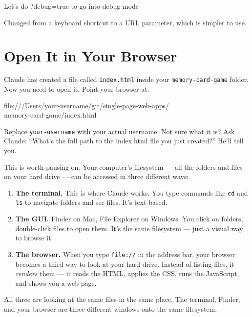 \documentclass[11pt,a4paper]{article}
\begin{document}
\begin{tcolorbox}[promptbox]
Let's do ?debug=true to go into debug mode
\end{tcolorbox}

Changed from a keyboard shortcut to a URL parameter, which is simpler to use.

\section{Open It in Your Browser}

Claude has created a file called \texttt{index.html} inside your \texttt{memory-card-game} folder. Now you need to open it. Point your browser at:

\begin{tcolorbox}[termbox]
file:///Users/your-username/git/single-page-web-apps/\\
\quad memory-card-game/index.html
\end{tcolorbox}

Replace \texttt{your-username} with your actual username. Not sure what it is? Ask Claude: ``What's the full path to the index.html file you just created?'' He'll tell you.

This is worth pausing on. Your computer's filesystem --- all the folders and files on your hard drive --- can be accessed in three different ways:

\begin{enumerate}[leftmargin=1.5em]
  \item \textbf{The terminal.} This is where Claude works. You type commands like \texttt{cd} and \texttt{ls} to navigate folders and see files. It's text-based.
  \item \textbf{The GUI.} Finder on Mac, File Explorer on Windows. You click on folders, double-click files to open them. It's the same filesystem --- just a visual way to browse it.
  \item \textbf{The browser.} When you type \texttt{file://} in the address bar, your browser becomes a third way to look at your hard drive. Instead of listing files, it \emph{renders} them --- it reads the HTML, applies the CSS, runs the JavaScript, and shows you a web page.
\end{enumerate}

All three are looking at the same files in the same place. The terminal, Finder, and your browser are three different windows onto the same filesystem.
\end{document}
